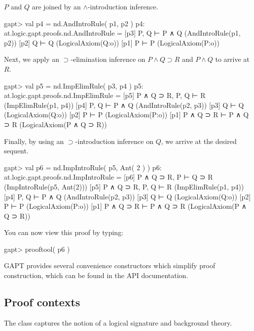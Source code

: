 \documentclass[a4paper,11pt]{article}
\newcommand{\impl}{\supset} %
\renewcommand{\land}{\wedge}
\newcommand{\cli}[1]{{\ttfamily {#1}}}
\begin{document}
$P$ and $Q$ are joined by an $\land$-introduction inference.

\begin{clilisting}
gapt> val p4 = nd.AndIntroRule( p1, p2 )
p4: at.logic.gapt.proofs.nd.AndIntroRule =
[p3] P, Q ⊢ P ∧ Q    (AndIntroRule(p1, p2))
[p2] Q ⊢ Q    (LogicalAxiom(Q:o))
[p1] P ⊢ P    (LogicalAxiom(P:o))

\end{clilisting}

Next, we apply an $\impl$-elimination inference on $P \land Q \impl R$
and $P \land Q$ to arrive at $R$.

\begin{clilisting}
gapt> val p5 = nd.ImpElimRule( p3, p4 )
p5: at.logic.gapt.proofs.nd.ImpElimRule =
[p5] P ∧ Q ⊃ R, P, Q ⊢ R    (ImpElimRule(p1, p4))
[p4] P, Q ⊢ P ∧ Q    (AndIntroRule(p2, p3))
[p3] Q ⊢ Q    (LogicalAxiom(Q:o))
[p2] P ⊢ P    (LogicalAxiom(P:o))
[p1] P ∧ Q ⊃ R ⊢ P ∧ Q ⊃ R    (LogicalAxiom(P ∧ Q ⊃ R))

\end{clilisting}

Finally, by using an $\impl$-introduction inference on $Q$, we arrive
at the desired sequent.

\begin{clilisting}
gapt> val p6 = nd.ImpIntroRule( p5, Ant( 2 ) )
p6: at.logic.gapt.proofs.nd.ImpIntroRule =
[p6] P ∧ Q ⊃ R, P ⊢ Q ⊃ R    (ImpIntroRule(p5, Ant(2)))
[p5] P ∧ Q ⊃ R, P, Q ⊢ R    (ImpElimRule(p1, p4))
[p4] P, Q ⊢ P ∧ Q    (AndIntroRule(p2, p3))
[p3] Q ⊢ Q    (LogicalAxiom(Q:o))
[p2] P ⊢ P    (LogicalAxiom(P:o))
[p1] P ∧ Q ⊃ R ⊢ P ∧ Q ⊃ R    (LogicalAxiom(P ∧ Q ⊃ R))

\end{clilisting}

You can now view this proof by typing:
\begin{clilisting}
gapt> prooftool( p6 )

\end{clilisting}

GAPT provides several convenience constructors which simplify proof
construction, which can be found in the API documentation.

\subsection{Proof contexts}\label{sec:context}
The \cli{Context} class captures the notion of a logical signature and background
theory.
\end{document}

